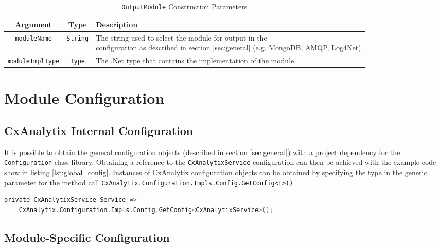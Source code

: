 \begin{table}
    \centering
    \begin{tabular}{|c|c|l|}
        \toprule
        \textbf{Argument} & \textbf{Type} & \textbf{Description}\\
        \midrule
        \texttt{moduleName} & \texttt{String} & \makecell[l]{The string used to select the module for output in the\\
        configuration as described in section \ref{sec:general} (e.g. MongoDB, AMQP, Log4Net)}\\
        \midrule
        \texttt{moduleImplType} & \texttt{Type} & The .Net type that contains the implementation of the module.\\
        \bottomrule
    \end{tabular}
    \caption{\texttt{OutputModule} Construction Parameters}
    \label{tab:output}
\end{table}


\section{Module Configuration}

\subsection{CxAnalytix Internal Configuration}\label{sec:internal_config}

It is possible to obtain the general configuration objects (described in section \ref{sec:general}) with a project dependency for the \texttt{Configuration}
class library.  Obtaining a reference to the \texttt{CxAnalytixService} configuration can then be achieved with the example code show in listing 
\ref{lst:global_config}.  Instances of CxAnalytix configuration objects can be obtained by specifying the type in the generic parameter for the 
method call \texttt{CxAnalytix.Configuration.Impls.Config.GetConfig<T>()} 

\begin{lstlisting}[caption={Retrieving a CxAnalytixService Config Object Instance}, label={lst:global_config}, language=C]
private CxAnalytixService Service => 
    CxAnalytix.Configuration.Impls.Config.GetConfig<CxAnalytixService>();
\end{lstlisting}


\subsection{Module-Specific Configuration}

